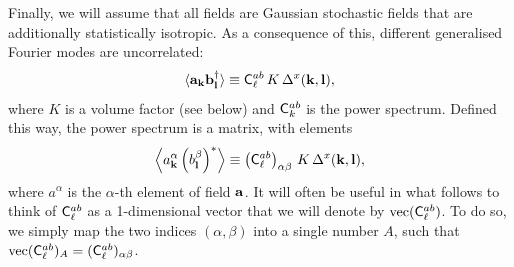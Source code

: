 \documentclass[a4paper,11pt]{article}
\begin{document}
    Finally, we will assume that all fields are Gaussian stochastic fields that are additionally statistically isotropic. As a consequence of this, different generalised Fourier modes are uncorrelated:
    \begin{equation}\label{eq:iso}
      \langle {\bf a}_{\bf k}{\bf b}^\dag_{\bf l}\rangle\equiv {\sf C}^{ab}_\ell\,K\,\Delta^x({\bf k},{\bf l}),
    \end{equation}
    where $K$ is a volume factor (see below) and ${\sf C}^{ab}_k$ is the power spectrum. Defined this way, the power spectrum is a matrix, with elements
    \begin{equation}
      \left\langle a^\alpha_{\bf k}\left(b^\beta_{\bf l}\right)^*\right\rangle\equiv \left({\sf C}^{ab}_\ell\right)_{\alpha\beta}\,K\,\Delta^x({\bf k},{\bf l}),
    \end{equation}
    where $a^\alpha$ is the $\alpha$-th element of field ${\bf a}$. It will often be useful in what follows to think of ${\sf C}^{ab}_\ell$ as a 1-dimensional vector that we will denote by ${\rm vec}({\sf C}^{ab}_\ell)$. To do so, we simply map the two indices $(\alpha,\beta)$ into a single number $A$, such that ${\rm vec}({\sf C}^{ab}_\ell)_A = ({\sf C}^{ab}_\ell)_{\alpha\beta}$.
\end{document}

